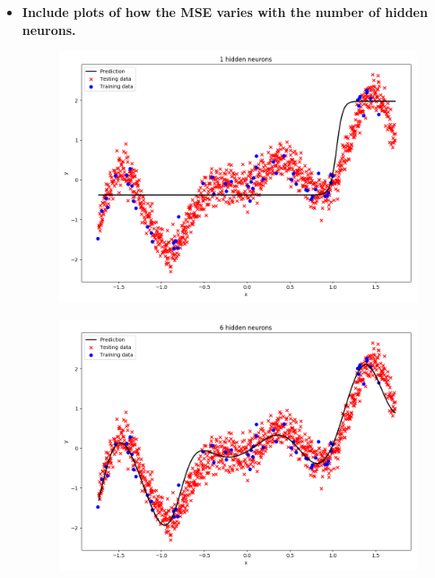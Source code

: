 \documentclass[a4paper]{article}
\begin{document}
\begin{enumerate}[label=(\alph*)]
\begin{itemize}
\item \textbf{Include plots of how the MSE varies with the number of hidden neurons.}
\begin{figure}[htp]
\centering
\begin{minipage}{0.4\textwidth}
  \includegraphics[scale=0.25]{plots/11c_1.png}
  \label{plot_simple_nh2}
\end{minipage}
\hfill
\begin{minipage}{0.4\textwidth}
  \includegraphics[scale=0.25]{plots/11c_6.png}
  \label{plot_simple_nh8}
\end{minipage}
\end{figure}


\end{itemize}
\end{enumerate}
\end{document}

